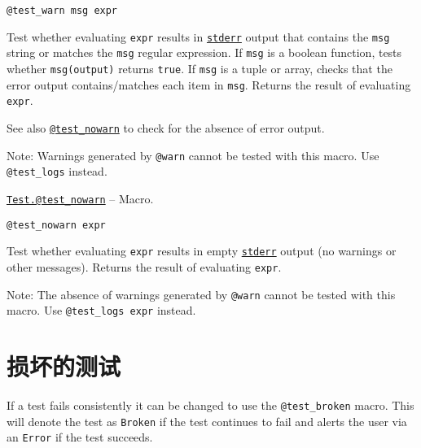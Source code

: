 \begin{adjustwidth}{2em}{0pt}


\begin{verbatim}
@test_warn msg expr
\end{verbatim}

Test whether evaluating \texttt{expr} results in \hyperlink{6150355911915549172}{\texttt{stderr}} output that contains the \texttt{msg} string or matches the \texttt{msg} regular expression.  If \texttt{msg} is a boolean function, tests whether \texttt{msg(output)} returns \texttt{true}.  If \texttt{msg} is a tuple or array, checks that the error output contains/matches each item in \texttt{msg}. Returns the result of evaluating \texttt{expr}.

See also \hyperlink{14168562674427079535}{\texttt{@test\_nowarn}} to check for the absence of error output.

Note: Warnings generated by \texttt{@warn} cannot be tested with this macro. Use \texttt{@test\_logs} instead.



\end{adjustwidth}
\hypertarget{14168562674427079535}{} 
\hyperlink{14168562674427079535}{\texttt{Test.@test\_nowarn}}  -- {Macro.}

\begin{adjustwidth}{2em}{0pt}


\begin{verbatim}
@test_nowarn expr
\end{verbatim}

Test whether evaluating \texttt{expr} results in empty \hyperlink{6150355911915549172}{\texttt{stderr}} output (no warnings or other messages).  Returns the result of evaluating \texttt{expr}.

Note: The absence of warnings generated by \texttt{@warn} cannot be tested with this macro. Use \texttt{@test\_logs expr} instead.



\end{adjustwidth}

\hypertarget{17956725815872473676}{}


\section{损坏的测试}



If a test fails consistently it can be changed to use the \texttt{@test\_broken} macro. This will denote the test as \texttt{Broken} if the test continues to fail and alerts the user via an \texttt{Error} if the test succeeds.


